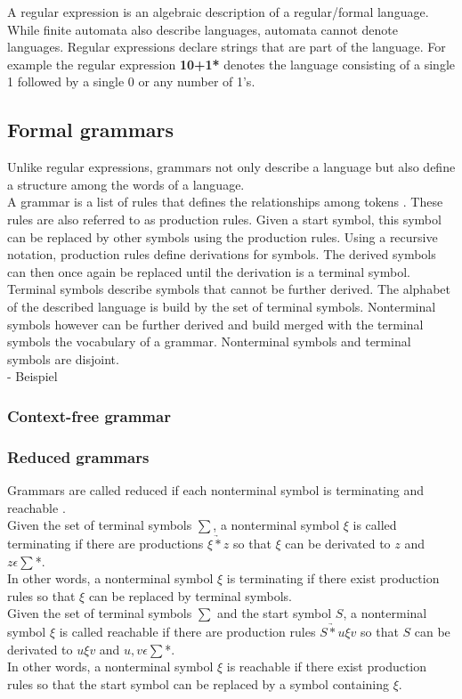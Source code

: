 A regular expression is an algebraic description of a regular/formal language. While finite automata also describe languages, automata cannot denote languages. Regular expressions declare strings that are part of the language. \cite{AutomataTheory.2007} 
For example the regular expression \textbf{10+1*} denotes the language consisting of a single 1 followed by a single 0 or any number of 1's. 


\subsection{Formal grammars}\label{sec:BackgroundGrammar}
Unlike regular expressions, grammars not only describe a language but also define a structure among the words of a language.\\
A grammar is a list of rules that defines the relationships among tokens \cite{LexYacc.1992}.
These rules are also referred to as production rules.
Given a start symbol, this symbol can be replaced by other symbols using the production rules.
Using a recursive notation, production rules define derivations for symbols. The derived symbols can then once again be replaced until the derivation is a terminal symbol.  
Terminal symbols describe symbols that cannot be further derived. The alphabet of the described language is build by the set of terminal symbols.
Nonterminal symbols however can be further derived and build  merged with the terminal symbols the vocabulary of a grammar. Nonterminal symbols and terminal symbols are disjoint. 
\\
- Beispiel

\subsubsection{Context-free grammar}

\subsubsection{Reduced grammars}
Grammars are called reduced if each nonterminal symbol is terminating and reachable \cite{Cremers75}. \\
Given the set of terminal symbols $\sum$, a nonterminal symbol $\xi$ is called terminating if there are productions $\xi \underrightarrow{*} z$ so that $\xi$ can be derivated to $z$ and $z \epsilon \sum$*. \\
In other words, a nonterminal symbol $\xi$ is terminating if there exist production rules so that  $\xi$ can be replaced by terminal symbols. \cite{Cremers75}\\
Given the set of terminal symbols $\sum$ and the start symbol $S$, a nonterminal symbol $\xi$ is called reachable if there are production rules $S \underrightarrow{*} u\xi v$ so that $S$ can be derivated to $u\xi v$ and $u,v \epsilon \sum$*. \\
In other words, a nonterminal symbol $\xi$ is reachable if there exist production rules so that the start symbol can be replaced by a symbol containing $\xi$. \cite{Cremers75}




